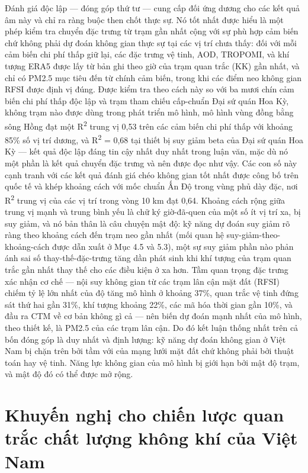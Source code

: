 Đánh giá độc lập --- đóng góp thứ tư --- cung cấp đối ứng dương cho các kết quả âm này và chỉ ra ràng buộc then chốt thực sự. Nó tốt nhất được hiểu là một phép kiểm tra chuyển đặc trưng từ trạm gần nhất cộng với sự phù hợp cảm biến chứ không phải dự đoán không gian thực sự tại các vị trí chưa thấy: đối với mỗi cảm biến chi phí thấp giữ lại, các đặc trưng vệ tinh, AOD, TROPOMI, và khí tượng ERA5 được lấy từ bản ghi theo giờ của trạm quan trắc (KK) gần nhất, và chỉ có PM2.5 mục tiêu đến từ chính cảm biến, trong khi các điểm neo không gian RFSI được định vị đúng. Được kiểm tra theo cách này so với ba mươi chín cảm biến chi phí thấp độc lập và trạm tham chiếu cấp-chuẩn Đại sứ quán Hoa Kỳ, không trạm nào được dùng trong phát triển mô hình, mô hình vùng đồng bằng sông Hồng đạt một R\textsuperscript{2} trung vị 0,53 trên các cảm biến chi phí thấp với khoảng 85\% số vị trí dương, và R\textsuperscript{2} = 0,68 tại thiết bị suy giảm beta của Đại sứ quán Hoa Kỳ --- kết quả độc lập đáng tin cậy nhất duy nhất trong luận văn, mặc dù nó một phần là kết quả chuyển đặc trưng và nên được đọc như vậy. Các con số này cạnh tranh với các kết quả đánh giá chéo không gian tốt nhất được công bố trên quốc tế và khép khoảng cách với mốc chuẩn Ấn Độ trong vùng phủ dày đặc, nơi R\textsuperscript{2} trung vị của các vị trí trong vòng 10 km đạt 0,64. Khoảng cách rộng giữa trung vị mạnh và trung bình yếu là chữ ký giờ-đã-quen của một số ít vị trí xa, bị suy giảm, và nó bản thân là câu chuyện mật độ: kỹ năng dự đoán suy giảm rõ ràng theo khoảng cách đến trạm neo gần nhất (mối quan hệ suy-giảm-theo-khoảng-cách được dẫn xuất ở Mục 4.5 và 5.3), một sự suy giảm phần nào phản ánh sai số thay-thế-đặc-trưng tăng dần phát sinh khi khí tượng của trạm quan trắc gần nhất thay thế cho các điều kiện ở xa hơn. Tầm quan trọng đặc trưng xác nhận cơ chế --- nội suy không gian từ các trạm lân cận mặt đất (RFSI) chiếm tỷ lệ lớn nhất của độ tăng mô hình ở khoảng 37\%, quan trắc vệ tinh đứng sát thứ hai gần 31\%, khí tượng khoảng 22\%, các mã hóa thời gian gần 10\%, và đầu ra CTM về cơ bản không gì cả --- nên biến dự đoán mạnh nhất của mô hình, theo thiết kế, là PM2.5 của các trạm lân cận. Do đó kết luận thống nhất trên cả bốn đóng góp là duy nhất và định lượng: kỹ năng dự đoán không gian ở Việt Nam bị chặn trên bởi tầm với của mạng lưới mặt đất chứ không phải bởi thuật toán hay vệ tinh. Năng lực không gian của mô hình bị giới hạn bởi mật độ trạm, và mật độ đó có thể được mở rộng.

\section{Khuyến nghị cho chiến lược quan trắc chất lượng không khí của Việt Nam}

